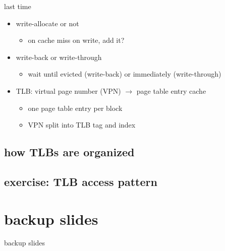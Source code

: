 \date{}
\title{}
\date{}

\begin{frame}
    \titlepage
\end{frame}


\usetikzlibrary{fit}


\begin{frame}{last time}
    \begin{itemize}
    \item write-allocate or not
        \begin{itemize}
        \item on cache miss on write, add it?
        \end{itemize}
    \item write-back or write-through
        \begin{itemize}
        \item wait until evicted (write-back) or immediately (write-through)
        \end{itemize}
    \item TLB: virtual page number (VPN) $\rightarrow$ page table entry cache
        \begin{itemize}
        \item one page table entry per block
        \item VPN split into TLB tag and index
        \end{itemize}
    \end{itemize}
\end{frame}


\subsection{how TLBs are organized}

\subsection{exercise: TLB access pattern}









\section{backup slides}
\begin{frame}{backup slides}
\end{frame}


